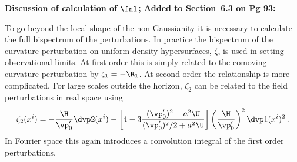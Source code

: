 \textbf{Discussion of calculation of $\fnl$; Added to Section~6.3 on Pg 93:}

To go beyond the local shape of the non-Gaussianity it is necessary to calculate the full
bispectrum of the perturbations. In practice the bispectrum of the curvature perturbation on
uniform density hypersurfaces, $\zeta$, is used in setting observational limits. At first order this
is simply related to the comoving curvature perturbation by $\zeta_1 = -\R_1$. At second order the
relationship is more complicated. For large scales outside the horizon, $\zeta_2$ can be related to
the field perturbations in real space using \cite{Malik:2005cy}
% 
\begin{equation}
 \zeta_2(x^i) = -\frac{\H}{\vp_0'}\dvp2(x^i) - \left[4 - 3\frac{(\vp_0')^2 - a^2\U}{(\vp_0')^2/2
+a^2\U} \right]\left(\frac{\H}{\vp_0'} \right)^2 \dvp1(x^i)^2\,. 
\end{equation}
% 
In Fourier space this again introduces a convolution integral of the first order perturbations.


